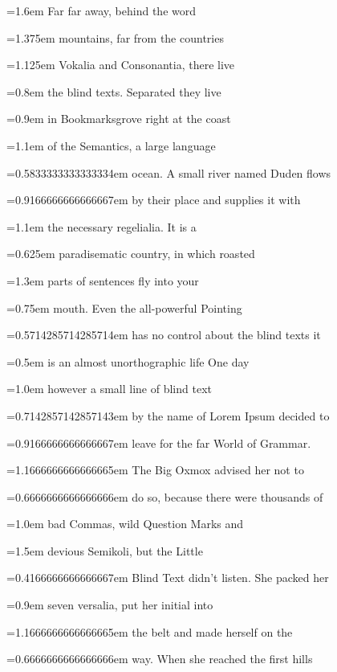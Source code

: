 \documentclass{article}
\begin{document}
 \font=1.6em Far far away, behind the word 

 \font=1.375em mountains, far from the countries 

 \font=1.125em Vokalia and Consonantia, there live 

 \font=0.8em the blind texts. Separated they live 

 \font=0.9em in Bookmarksgrove right at the coast 

 \font=1.1em of the Semantics, a large language 

 \font=0.5833333333333334em ocean. A small river named Duden flows 

 \font=0.9166666666666667em by their place and supplies it with 

 \font=1.1em the necessary regelialia. It is a 

 \font=0.625em paradisematic country, in which roasted 

 \font=1.3em parts of sentences fly into your 

 \font=0.75em mouth. Even the all-powerful Pointing 

 \font=0.5714285714285714em has no control about the blind texts it 

 \font=0.5em is an almost unorthographic life One day 

 \font=1.0em however a small line of blind text 

 \font=0.7142857142857143em by the name of Lorem Ipsum decided to 

 \font=0.9166666666666667em leave for the far World of Grammar. 

 \font=1.1666666666666665em The Big Oxmox advised her not to 

 \font=0.6666666666666666em do so, because there were thousands of 

 \font=1.0em bad Commas, wild Question Marks and 

 \font=1.5em devious Semikoli, but the Little 

 \font=0.4166666666666667em Blind Text didn’t listen. She packed her 

 \font=0.9em seven versalia, put her initial into 

 \font=1.1666666666666665em the belt and made herself on the 

 \font=0.6666666666666666em way. When she reached the first hills 
\end{document}
